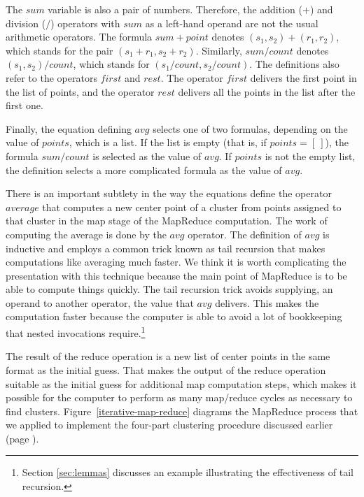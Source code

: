 The $sum$ variable is also a pair of numbers.
Therefore, the addition ($+$) and division ($/$) operators
with $sum$ as a left-hand operand are not the usual arithmetic operators.
The formula $sum + point$ denotes $(s_1, s_2) + (r_1,r_2)$,
which stands for the pair $(s_1+r_1, s_2+r_2)$.
Similarly, $sum/count$ denotes $(s_1,s_2)/count$,
which stands for $(s_1/count, s_2/count)$.
The definitions also refer to the operators $first$ and $rest$.
The operator $first$ delivers the first point in the list of points,
and the operator $rest$ delivers all the points in the list
after the first one.

Finally, the equation defining $avg$ selects one of two formulas,
depending on the value of $points$, which is a list.
If the list is empty (that is, if $points = [~]$),
the formula $sum/count$ is selected as the value of $avg$.
If $points$ is not the empty list, the definition selects
a more complicated formula as the value of $avg$.

There is an important subtlety in the way the equations define
the operator $average$ that computes a new center point of a cluster
from points assigned to that cluster in the map stage of the
MapReduce computation.
The work of computing the average is done by the $avg$ operator.
The definition of $avg$ is inductive and
employs a common trick known as tail recursion
that makes computations like averaging much faster.
We think it is worth complicating the presentation
with this technique because the main point
of MapReduce is to be able to compute things quickly.
The tail recursion 
trick avoids supplying, an operand to another operator,
the value that $avg$ delivers.
This makes the computation
faster because the computer is able to avoid a lot of bookkeeping that nested
invocations require.\footnote{Section \ref{sec:lemmas} discusses an
example illustrating the effectiveness of tail recursion.}

The result of the reduce operation is a new list of center points
in the same format as the initial guess.
That makes the output of the
reduce operation suitable as
the initial guess for additional map computation steps,
which makes it possible for the computer to perform as many 
map/reduce cycles as necessary to find clusters. 
Figure~\ref{iterative-map-reduce} diagrams the MapReduce
process that we applied to implement the four-part clustering procedure
discussed earlier (page \pageref{cluster-process}).

